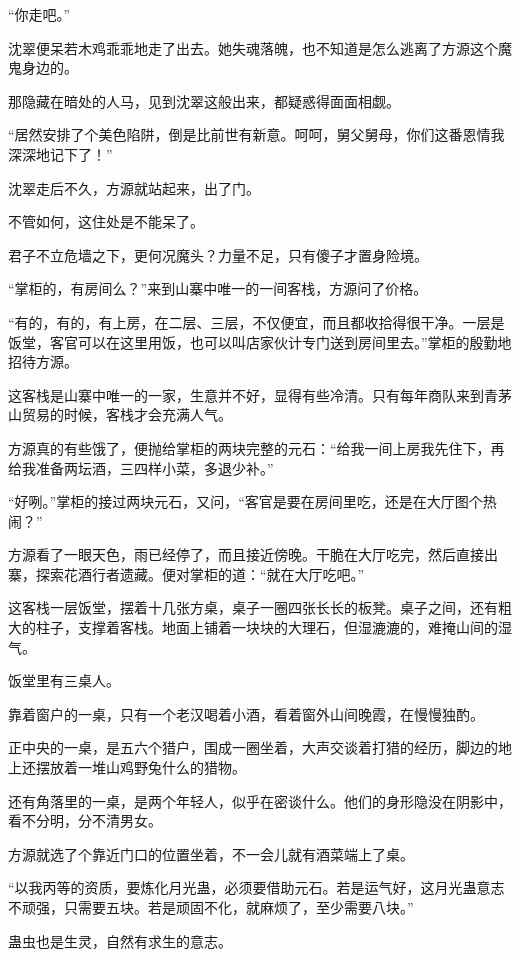 \begin{this_body}
“你走吧。”

沈翠便呆若木鸡乖乖地走了出去。她失魂落魄，也不知道是怎么逃离了方源这个魔鬼身边的。

那隐藏在暗处的人马，见到沈翠这般出来，都疑惑得面面相觑。

“居然安排了个美色陷阱，倒是比前世有新意。呵呵，舅父舅母，你们这番恩情我深深地记下了！”

沈翠走后不久，方源就站起来，出了门。

不管如何，这住处是不能呆了。

君子不立危墙之下，更何况魔头？力量不足，只有傻子才置身险境。

“掌柜的，有房间么？”来到山寨中唯一的一间客栈，方源问了价格。

“有的，有的，有上房，在二层、三层，不仅便宜，而且都收拾得很干净。一层是饭堂，客官可以在这里用饭，也可以叫店家伙计专门送到房间里去。”掌柜的殷勤地招待方源。

这客栈是山寨中唯一的一家，生意并不好，显得有些冷清。只有每年商队来到青茅山贸易的时候，客栈才会充满人气。

方源真的有些饿了，便抛给掌柜的两块完整的元石：“给我一间上房我先住下，再给我准备两坛酒，三四样小菜，多退少补。”

“好咧。”掌柜的接过两块元石，又问，“客官是要在房间里吃，还是在大厅图个热闹？”

方源看了一眼天色，雨已经停了，而且接近傍晚。干脆在大厅吃完，然后直接出寨，探索花酒行者遗藏。便对掌柜的道：“就在大厅吃吧。”

这客栈一层饭堂，摆着十几张方桌，桌子一圈四张长长的板凳。桌子之间，还有粗大的柱子，支撑着客栈。地面上铺着一块块的大理石，但湿漉漉的，难掩山间的湿气。

饭堂里有三桌人。

靠着窗户的一桌，只有一个老汉喝着小酒，看着窗外山间晚霞，在慢慢独酌。

正中央的一桌，是五六个猎户，围成一圈坐着，大声交谈着打猎的经历，脚边的地上还摆放着一堆山鸡野兔什么的猎物。

还有角落里的一桌，是两个年轻人，似乎在密谈什么。他们的身形隐没在阴影中，看不分明，分不清男女。

方源就选了个靠近门口的位置坐着，不一会儿就有酒菜端上了桌。

“以我丙等的资质，要炼化月光蛊，必须要借助元石。若是运气好，这月光蛊意志不顽强，只需要五块。若是顽固不化，就麻烦了，至少需要八块。”

蛊虫也是生灵，自然有求生的意志。


\end{this_body}
